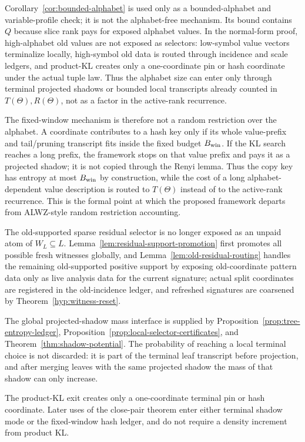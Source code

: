 \documentclass[11pt]{article}
\begin{document}
Corollary~\ref{cor:bounded-alphabet} is used only as a bounded-alphabet and
variable-profile check; it is not the alphabet-free mechanism.  Its bound
contains $Q$ because slice rank pays for exposed alphabet values.  In the
normal-form proof, high-alphabet old values are not exposed as selectors:
low-symbol value vectors terminalize locally, high-symbol old data is routed
through incidence and scale ledgers, and product-KL creates only a
one-coordinate pin or hash coordinate under the actual tuple law.  Thus the
alphabet size can enter only through terminal projected shadows or bounded
local transcripts already counted in $T(\Theta),R(\Theta)$, not as a factor in
the active-rank recurrence.

The fixed-window mechanism is therefore not a random restriction over the
alphabet.  A coordinate contributes to a hash key only if its whole value-prefix
and tail/pruning transcript fits inside the fixed budget $B_{\rm win}$.  If the
KL search reaches a long prefix, the framework stops on that value prefix and pays
it as a projected shadow; it is not copied through the Renyi lemma.  Thus the
copy key has entropy at most $B_{\rm win}$ by construction, while the cost of a
long alphabet-dependent value description is routed to $T(\Theta)$ instead of
to the active-rank recurrence.  This is the formal point at which the proposed
framework departs from ALWZ-style random restriction accounting.

The old-supported sparse residual selector is no longer exposed as an unpaid
atom of $W_L\subseteq L$.  Lemma~\ref{lem:residual-support-promotion} first
promotes all possible fresh witnesses globally, and
Lemma~\ref{lem:old-residual-routing} handles the remaining old-supported
positive support by exposing old-coordinate pattern data only as live analysis
data for the current signature; actual split coordinates are registered in the
old-incidence ledger, and refreshed signatures are coarsened by
Theorem~\ref{hyp:witness-reset}.

The global projected-shadow mass interface is supplied by
Proposition~\ref{prop:tree-entropy-ledger},
Proposition~\ref{prop:local-selector-certificates}, and
Theorem~\ref{thm:shadow-potential}.  The probability of reaching a local
terminal choice is not discarded: it is part of the terminal leaf transcript
before projection, and after merging leaves with the same projected shadow the
mass of that shadow can only increase.

The product-KL exit creates only a one-coordinate terminal pin or hash
coordinate.  Later uses of the close-pair theorem enter either terminal
shadow mode or the fixed-window hash ledger, and do not require a density
increment from product KL.
\end{document}

